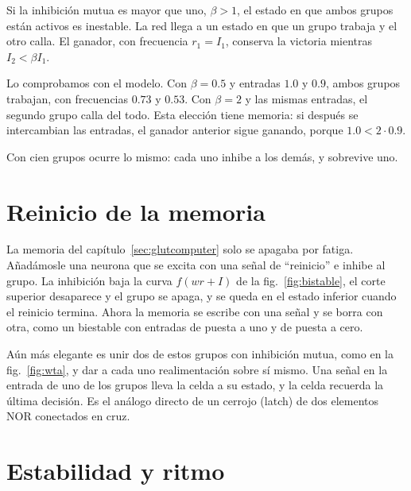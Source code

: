 \begin{keyblock}
\begin{proposition}
\label{prop:wta}
Si la inhibición mutua es mayor que uno, $\beta>1$, el estado en que ambos grupos están activos es inestable. La red llega a un estado en que un grupo trabaja y el otro calla. El ganador, con frecuencia $r_1=I_1$, conserva la victoria mientras $I_2<\beta I_1$.
\end{proposition}
\end{keyblock}

Lo comprobamos con el modelo. Con $\beta=0.5$ y entradas $1.0$ y $0.9$, ambos grupos trabajan, con frecuencias $0.73$ y $0.53$. Con $\beta=2$ y las mismas entradas, el segundo grupo calla del todo. Esta elección tiene memoria: si después se intercambian las entradas, el ganador anterior sigue ganando, porque $1.0<2\cdot0.9$.

Con cien grupos ocurre lo mismo: cada uno inhibe a los demás, y sobrevive uno.

\section{Reinicio de la memoria}

La memoria del capítulo~\ref{sec:glutcomputer} solo se apagaba por fatiga. Añadámosle una neurona  que se excita con una señal de “reinicio” e inhibe al grupo. La inhibición baja la curva $f(wr+I)$ de la fig.~\ref{fig:bistable}, el corte superior desaparece y el grupo se apaga, y se queda en el estado inferior cuando el reinicio termina. Ahora la memoria se escribe con una señal y se borra con otra, como un biestable con entradas de puesta a uno y de puesta a cero.

Aún más elegante es unir dos de estos grupos con inhibición mutua, como en la fig.~\ref{fig:wta}, y dar a cada uno realimentación sobre sí mismo. Una señal en la entrada de uno de los grupos lleva la celda a su estado, y la celda recuerda la última decisión. Es el análogo directo de un cerrojo (latch) de dos elementos NOR conectados en cruz.

\section{Estabilidad y ritmo}

